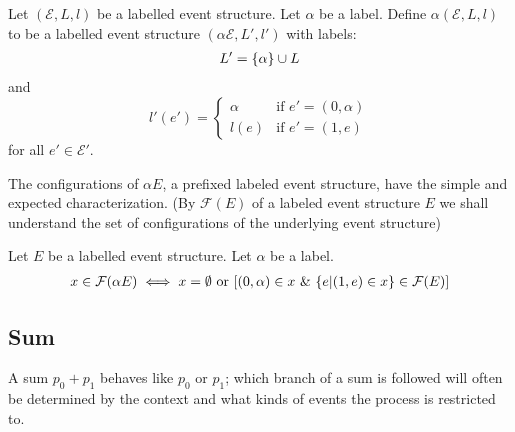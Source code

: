\documentclass{article}
\begin{document}
\begin{definition}
    Let $(\mathcal{E},L,l)$ be a labelled event structure.
    Let $\alpha$ be a label.
    Define $\alpha(\mathcal{E},L,l)$ to be a labelled event structure $(\alpha \mathcal{E},L',l')$
    with labels:
    \begin{align*}
        L' = \{\alpha\} \cup L
    \end{align*}
    and
    $$
        l'(e') = \begin{cases}
            \alpha & \text{if } e' = (0,\alpha) \\
            l(e)   & \text{if } e' = (1,e)
        \end{cases}
    $$
    for all $e' \in \mathcal{E'}$.
\end{definition}
The configurations of $\alpha E$, a prefixed labeled event structure,
have the simple and expected characterization.
(By $\mathcal{F}(E)$ of a labeled event structure $E$ we shall understand the set
of configurations of the underlying event structure)

\begin{proposition}

    Let $E$ be a labelled event structure. Let $\alpha$ be a label.
    \begin{align*}
        x \in \mathcal{F}(\alpha E) \iff x = \emptyset \text{ or }
        [(0,\alpha)\in x \ \& \  \{e | (1,e)\in x\} \in \mathcal{F}(E)]
    \end{align*}

\end{proposition}

\subsection{Sum}
A sum $p_0 + p_1$ behaves like $p_0$ or $p_1$; which branch of a sum is followed will
often be determined by the context and what kinds of events the process is restricted to.
\end{document}

